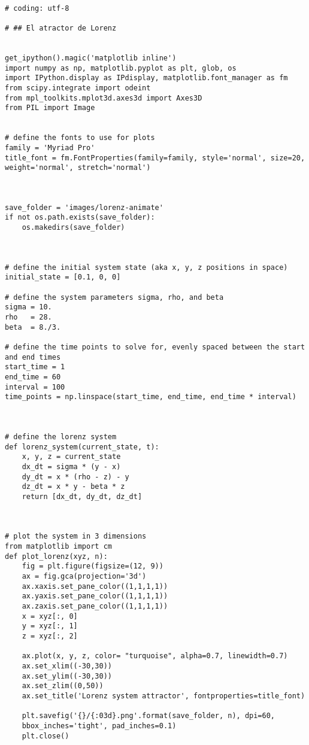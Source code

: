 \begin{verbatim}

# coding: utf-8

# ## El atractor de Lorenz


get_ipython().magic('matplotlib inline')
import numpy as np, matplotlib.pyplot as plt, glob, os
import IPython.display as IPdisplay, matplotlib.font_manager as fm
from scipy.integrate import odeint
from mpl_toolkits.mplot3d.axes3d import Axes3D
from PIL import Image


# define the fonts to use for plots
family = 'Myriad Pro'
title_font = fm.FontProperties(family=family, style='normal', size=20, 
weight='normal', stretch='normal')



save_folder = 'images/lorenz-animate'
if not os.path.exists(save_folder):
    os.makedirs(save_folder)



# define the initial system state (aka x, y, z positions in space)
initial_state = [0.1, 0, 0]

# define the system parameters sigma, rho, and beta
sigma = 10.
rho   = 28.
beta  = 8./3.

# define the time points to solve for, evenly spaced between the start 
and end times
start_time = 1
end_time = 60
interval = 100
time_points = np.linspace(start_time, end_time, end_time * interval)



# define the lorenz system
def lorenz_system(current_state, t):
    x, y, z = current_state
    dx_dt = sigma * (y - x)
    dy_dt = x * (rho - z) - y
    dz_dt = x * y - beta * z
    return [dx_dt, dy_dt, dz_dt]



# plot the system in 3 dimensions
from matplotlib import cm
def plot_lorenz(xyz, n):
    fig = plt.figure(figsize=(12, 9))
    ax = fig.gca(projection='3d')
    ax.xaxis.set_pane_color((1,1,1,1))
    ax.yaxis.set_pane_color((1,1,1,1))
    ax.zaxis.set_pane_color((1,1,1,1))
    x = xyz[:, 0]
    y = xyz[:, 1]
    z = xyz[:, 2]
    
    ax.plot(x, y, z, color= "turquoise", alpha=0.7, linewidth=0.7)
    ax.set_xlim((-30,30))
    ax.set_ylim((-30,30))
    ax.set_zlim((0,50))
    ax.set_title('Lorenz system attractor', fontproperties=title_font)
    
    plt.savefig('{}/{:03d}.png'.format(save_folder, n), dpi=60, 
    bbox_inches='tight', pad_inches=0.1)
    plt.close()




\end{verbatim}

